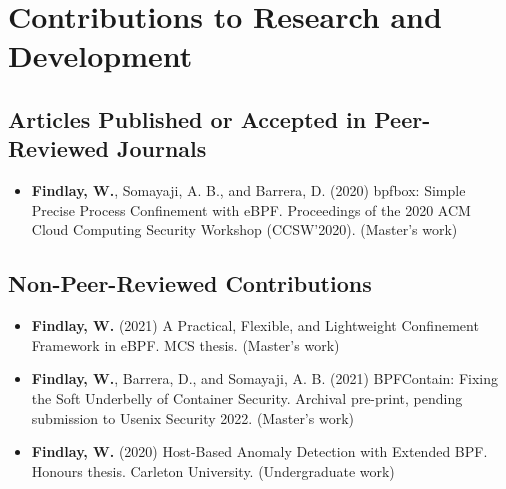 \setcounter{page}{1}

\section{Contributions to Research and Development}

\subsection{Articles Published or Accepted in Peer-Reviewed Journals}

\begin{itemize}[~,noitemsep]
    \item \textbf{Findlay, W.}, Somayaji, A. B., and Barrera, D. (2020) bpfbox:
    Simple Precise Process Confinement with eBPF. Proceedings of the 2020 ACM
    Cloud Computing Security Workshop (CCSW'2020). (Master's work)
\end{itemize}

\setcounter{subsection}{3}
\subsection{Non-Peer-Reviewed Contributions}

\begin{itemize}[~,noitemsep]
    \item \textbf{Findlay, W.} (2021) A Practical, Flexible, and Lightweight Confinement
    Framework in eBPF. MCS thesis. (Master's work)
    \item \textbf{Findlay, W.}, Barrera, D., and Somayaji, A. B. (2021) BPFContain: Fixing the Soft Underbelly of Container Security. Archival pre-print, pending submission to Usenix Security 2022. (Master's work)
    \item \textbf{Findlay, W.} (2020) Host-Based Anomaly Detection with Extended
    BPF. Honours thesis. Carleton University. (Undergraduate work)
\end{itemize}

